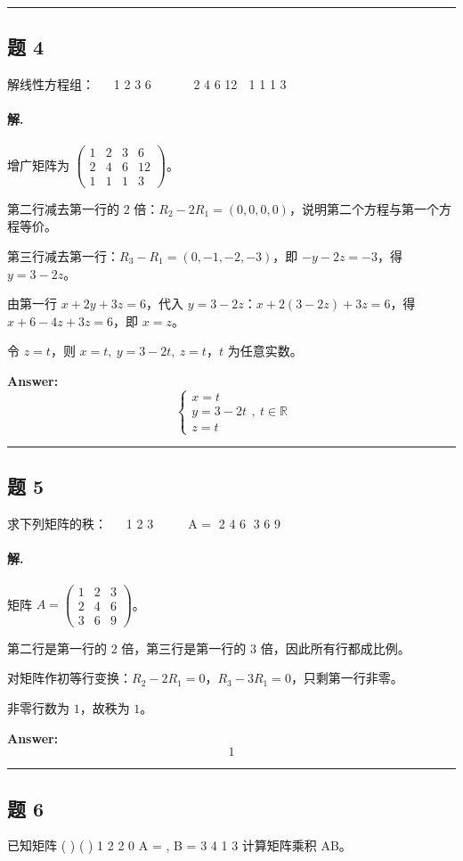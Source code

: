 \documentclass[12pt, a4paper]{article}
\newcommand{\problem}[1]{\subsection*{题 #1}}
\newcommand{\solution}{\paragraph{解.}}
\begin{document}
\vspace{1em}
\hrule
\vspace{1em}

\problem{4}

解线性方程组：  
1 2 3 6
 
 
 2 4 6 12 
1 1 1 3

\solution

增广矩阵为 $\begin{pmatrix}1&2&3&6\\2&4&6&12\\1&1&1&3\end{pmatrix}$。

第二行减去第一行的 $2$ 倍：$R_2-2R_1=(0,0,0,0)$，说明第二个方程与第一个方程等价。

第三行减去第一行：$R_3-R_1=(0,-1,-2,-3)$，即 $-y-2z=-3$，得 $y=3-2z$。

由第一行 $x+2y+3z=6$，代入 $y=3-2z$：$x+2(3-2z)+3z=6$，得 $x+6-4z+3z=6$，即 $x=z$。

令 $z=t$，则 $x=t,\ y=3-2t,\ z=t$，$t$ 为任意实数。

\textbf{Answer:}
\[\boxed{\begin{cases}x=t\\y=3-2t\\z=t\end{cases},\ t\in\mathbb{R}}\]

\vspace{1em}
\hrule
\vspace{1em}

\problem{5}

求下列矩阵的秩：  
1 2 3
 
 
A = 2 4 6
3 6 9

\solution

矩阵 $A=\begin{pmatrix}1&2&3\\2&4&6\\3&6&9\end{pmatrix}$。

第二行是第一行的 $2$ 倍，第三行是第一行的 $3$ 倍，因此所有行都成比例。

对矩阵作初等行变换：$R_2-2R_1=0$，$R_3-3R_1=0$，只剩第一行非零。

非零行数为 $1$，故秩为 $1$。

\textbf{Answer:}
\[\boxed{1}\]

\vspace{1em}
\hrule
\vspace{1em}

\problem{6}

已知矩阵 ( ) ( )
1 2 2 0
A = , B =
3 4 1 3
计算矩阵乘积 AB。
\end{document}
